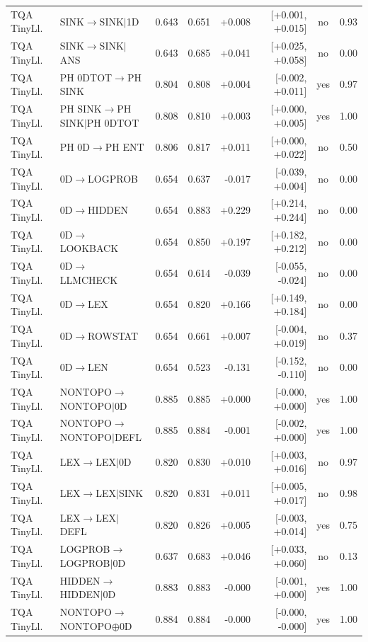 \begin{longtable}{llrrrrcc}
TQA TinyLl. & SINK$\to$SINK$\mid$1D & 0.643 & 0.651 & +0.008 & [+0.001, +0.015] & no & 0.93 \\
TQA TinyLl. & SINK$\to$SINK$\mid$ANS & 0.643 & 0.685 & +0.041 & [+0.025, +0.058] & no & 0.00 \\
TQA TinyLl. & PH 0DTOT$\to$PH SINK & 0.804 & 0.808 & +0.004 & [-0.002, +0.011] & yes & 0.97 \\
TQA TinyLl. & PH SINK$\to$PH SINK$\mid$PH 0DTOT & 0.808 & 0.810 & +0.003 & [+0.000, +0.005] & yes & 1.00 \\
TQA TinyLl. & PH 0D$\to$PH ENT & 0.806 & 0.817 & +0.011 & [+0.000, +0.022] & no & 0.50 \\
TQA TinyLl. & 0D$\to$LOGPROB & 0.654 & 0.637 & -0.017 & [-0.039, +0.004] & no & 0.00 \\
TQA TinyLl. & 0D$\to$HIDDEN & 0.654 & 0.883 & +0.229 & [+0.214, +0.244] & no & 0.00 \\
TQA TinyLl. & 0D$\to$LOOKBACK & 0.654 & 0.850 & +0.197 & [+0.182, +0.212] & no & 0.00 \\
TQA TinyLl. & 0D$\to$LLMCHECK & 0.654 & 0.614 & -0.039 & [-0.055, -0.024] & no & 0.00 \\
TQA TinyLl. & 0D$\to$LEX & 0.654 & 0.820 & +0.166 & [+0.149, +0.184] & no & 0.00 \\
TQA TinyLl. & 0D$\to$ROWSTAT & 0.654 & 0.661 & +0.007 & [-0.004, +0.019] & no & 0.37 \\
TQA TinyLl. & 0D$\to$LEN & 0.654 & 0.523 & -0.131 & [-0.152, -0.110] & no & 0.00 \\
TQA TinyLl. & NONTOPO$\to$NONTOPO$\mid$0D & 0.885 & 0.885 & +0.000 & [-0.000, +0.000] & yes & 1.00 \\
TQA TinyLl. & NONTOPO$\to$NONTOPO$\mid$DEFL & 0.885 & 0.884 & -0.001 & [-0.002, +0.000] & yes & 1.00 \\
TQA TinyLl. & LEX$\to$LEX$\mid$0D & 0.820 & 0.830 & +0.010 & [+0.003, +0.016] & no & 0.97 \\
TQA TinyLl. & LEX$\to$LEX$\mid$SINK & 0.820 & 0.831 & +0.011 & [+0.005, +0.017] & no & 0.98 \\
TQA TinyLl. & LEX$\to$LEX$\mid$DEFL & 0.820 & 0.826 & +0.005 & [-0.003, +0.014] & yes & 0.75 \\
TQA TinyLl. & LOGPROB$\to$LOGPROB$\mid$0D & 0.637 & 0.683 & +0.046 & [+0.033, +0.060] & no & 0.13 \\
TQA TinyLl. & HIDDEN$\to$HIDDEN$\mid$0D & 0.883 & 0.883 & -0.000 & [-0.001, +0.000] & yes & 1.00 \\
TQA TinyLl. & NONTOPO$\to$NONTOPO$\oplus$0D & 0.884 & 0.884 & -0.000 & [-0.000, -0.000] & yes & 1.00 \\

\end{longtable}
